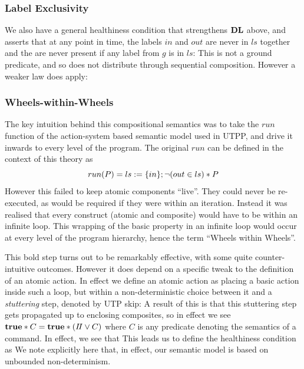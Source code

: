 \subsubsection{Label Exclusivity}\label{sssec:label-exclude}

We also have a general healthiness condition that strengthens $\mathbf{DL}$ above,
and asserts that at any point in time, the labels $in$ and $out$ are never in
$ls$ together and the are never present if any label from $g$ is in $ls$:
 This is not a ground predicate, and so does not distribute through
sequential composition. However a weaker law does apply: 




\subsubsection{Wheels-within-Wheels}\label{sssec:WwW}

The key intuition behind this compositional semantics was to take the
$run$ function of the action-system based semantic model used in UTPP,
and drive it inwards to every level of the program.
The original $run$ can be defined in the context of this theory as
\[
  run(P) = ls := \{in\} ; \lnot (out \in ls) * P
\]
However this failed to keep atomic components ``live''.
They could never be re-executed,
as would be required if they were within an iteration.
Instead it was realised that every construct (atomic and composite)
would have to be within an infinite loop.%
%
This wrapping of the basic property in an infinite loop
would occur at every level of the program hierarchy,
hence the term ``Wheels within Wheels''.

This bold step turns out to be remarkably effective,
with some quite counter-intuitive outcomes.
However it does depend on a specific tweak to the
definition of an atomic action.
In effect we define an atomic action
as placing a basic action inside such a loop,
but within a non-deterministic choice between it
and a \emph{stuttering} step, denoted by UTP skip:
A result of this is that this stuttering step gets
propagated up to enclosing composites,
so in effect we see $\mathbf{true} * C = \mathbf{true} * (I\!I\lor C)$
where $C$ is any predicate denoting the semantics of a command.
In effect,
we  see that
 This leads us to define the healthiness condition as
 We note explicitly here that, in effect, our semantic model is based on
unbounded non-determinism.

